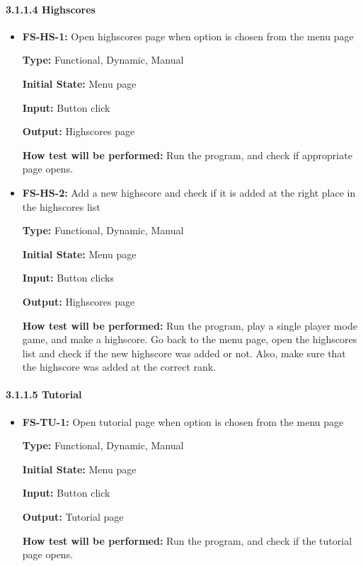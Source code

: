 \documentclass[12pt,letterpaper]{article}
\begin{document}
	\paragraph{3.1.1.4 Highscores}
\begin{reqbox}
	\begin{itemize}
	\item \textbf{FS-HS-1: }Open highscores page when option is chosen from the menu page

	\textbf{Type: }Functional, Dynamic, Manual	

	\textbf{Initial State:} Menu page

	\textbf{Input: }Button click 

	\textbf{Output: }Highscores page

	\textbf{How test will be performed: }Run the program, and check if appropriate page opens.
	\end{itemize}
\end{reqbox}

\begin{reqbox}
	\begin{itemize}
	\item \textbf{FS-HS-2: }Add a new highscore and check if it is added at the right place in the highscores list

	\textbf{Type: }Functional, Dynamic, Manual

	\textbf{Initial State: }Menu page

	\textbf{Input: }Button clicks 

	\textbf{Output: }Highscores page

	\textbf{How test will be performed:} Run the program, play a single player mode game, and make a highscore. Go back to the menu page, open the highscores list and check if the new highscore was added or not. Also, make sure that the highscore was added at the correct rank.
	\end{itemize}
\end{reqbox}

	\paragraph{3.1.1.5 Tutorial}
\begin{reqbox}
	\begin{itemize}
	\item\textbf{ FS-TU-1:} Open tutorial page when option is chosen from the menu page

	\textbf{Type: }Functional, Dynamic, Manual

	\textbf{Initial State: }Menu page

	\textbf{Input: }Button click 

	\textbf{Output: }Tutorial page

	\textbf{How test will be performed: }Run the program, and check if the tutorial page opens.
	\end{itemize}
\end{reqbox}
\end{document}
